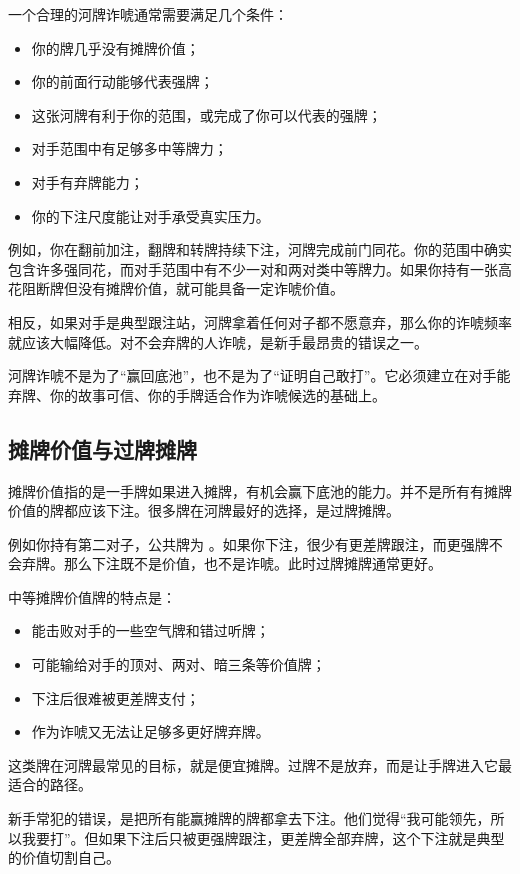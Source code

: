 一个合理的河牌诈唬通常需要满足几个条件：

\begin{itemize}
\item 你的牌几乎没有摊牌价值；
\item 你的前面行动能够代表强牌；
\item 这张河牌有利于你的范围，或完成了你可以代表的强牌；
\item 对手范围中有足够多中等牌力；
\item 对手有弃牌能力；
\item 你的下注尺度能让对手承受真实压力。
\end{itemize}

例如，你在翻前加注，翻牌和转牌持续下注，河牌完成前门同花。你的范围中确实包含许多强同花，而对手范围中有不少一对和两对类中等牌力。如果你持有一张高花阻断牌但没有摊牌价值，就可能具备一定诈唬价值。

相反，如果对手是典型跟注站，河牌拿着任何对子都不愿意弃，那么你的诈唬频率就应该大幅降低。对不会弃牌的人诈唬，是新手最昂贵的错误之一。

河牌诈唬不是为了“赢回底池”，也不是为了“证明自己敢打”。它必须建立在对手能弃牌、你的故事可信、你的手牌适合作为诈唬候选的基础上。

\subsection{摊牌价值与过牌摊牌}

摊牌价值指的是一手牌如果进入摊牌，有机会赢下底池的能力。并不是所有有摊牌价值的牌都应该下注。很多牌在河牌最好的选择，是过牌摊牌。

例如你持有第二对子，公共牌为 。如果你下注，很少有更差牌跟注，而更强牌不会弃牌。那么下注既不是价值，也不是诈唬。此时过牌摊牌通常更好。

中等摊牌价值牌的特点是：

\begin{itemize}
\item 能击败对手的一些空气牌和错过听牌；
\item 可能输给对手的顶对、两对、暗三条等价值牌；
\item 下注后很难被更差牌支付；
\item 作为诈唬又无法让足够多更好牌弃牌。
\end{itemize}

这类牌在河牌最常见的目标，就是便宜摊牌。过牌不是放弃，而是让手牌进入它最适合的路径。

新手常犯的错误，是把所有能赢摊牌的牌都拿去下注。他们觉得“我可能领先，所以我要打”。但如果下注后只被更强牌跟注，更差牌全部弃牌，这个下注就是典型的价值切割自己。

